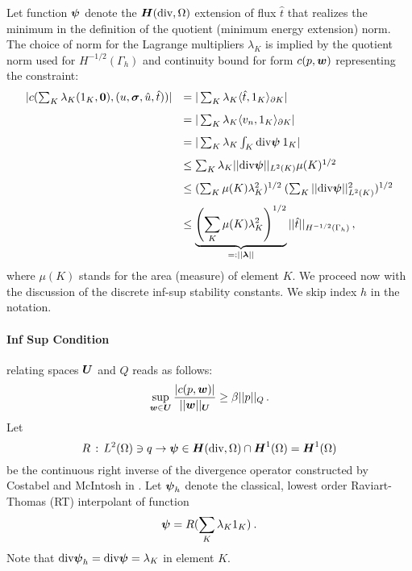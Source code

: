 \documentclass{report}
\begin{document}
Let function $\boldsymbol\psi$ denote the $\mbox{\boldmath $H$}(\text{div},\Omega)$ extension of flux $\hat{t}$
that realizes the minimum in the definition of the quotient (minimum energy
extension) norm.
The choice of norm for the Lagrange multipliers $\lambda_K$ is implied
by the quotient norm used for $H^{-1/2}(\Gamma_h)$ and continuity
bound for form $c(p,\boldsymbol w)$ representing the constraint:
\begin{equation}
\begin{array}{lll}
| c(\sum_K \lambda_K (1_K,{\bf 0}),(u,\boldsymbol\sigma,\hat{u},\hat{t})) |
& = | \sum_K \lambda_K \langle \hat{t}, 1_K \rangle_{\partial K} | \\[8pt]
& = | \sum_K \lambda_K \langle v_n , 1_K \rangle_{\partial K} | \\[8pt]
& = | \sum_K \lambda_K \int_K \text{div} \boldsymbol\psi \: 1_K  | \\[8pt]
& \leq \sum_K  \lambda_K || \text{div} \boldsymbol\psi ||_{L^2(K)} \mu(K)^{1/2} \\[8pt]
& \leq (\sum_K \mu(K) \lambda_K^2)^{1/2} \: (\sum_K || \text{div} \boldsymbol\psi ||_{L^2(K)}^2 )^{1/2} \\[8pt]
& \leq \underbrace{\left(\sum_K \mu(K) \lambda_K^2\right)^{1/2}}_{=: || \boldsymbol\lambda ||} ||
\hat{t} ||_{H^{-1/2}(\Gamma_h)}\,,
\end{array}
\end{equation}
where $\mu(K)$ stands for the area (measure) of element $K$.
We proceed now with the discussion of the discrete inf-sup stability constants. We skip
index $h$ in the notation.

\paragraph{Inf Sup Condition} relating spaces $\boldsymbol U$ and $Q$ reads as follows:
\begin{equation}
   \sup_{\boldsymbol w \in \boldsymbol U} \frac{| c(p,\boldsymbol w) |}{|| \boldsymbol w ||_{\boldsymbol U}} \geq \beta ||
   p ||_Q\,.
\end{equation}
Let
\begin{equation}
R\, : \, L^2(\Omega) \ni q \to \boldsymbol\psi \in \mbox{\boldmath $H$}(\text{div},\Omega) \cap \mbox{\boldmath $H$}^1(\Omega)
=\mbox{\boldmath $H$}^1(\Omega)
\end{equation}
be
the continuous right inverse of the divergence operator constructed by
Costabel and McIntosh in \cite{CostabelMcIntosh}.
Let $\boldsymbol\psi_h$ denote the classical, lowest order Raviart-Thomas (RT) interpolant of
function
\begin{equation}
\boldsymbol\psi = R (\sum_K \lambda_K 1_K) \: .
\end{equation}
Note that $\text{div} \boldsymbol\psi_h = \text{div} \boldsymbol\psi = \lambda_K$ in element $K$.
\end{document}
